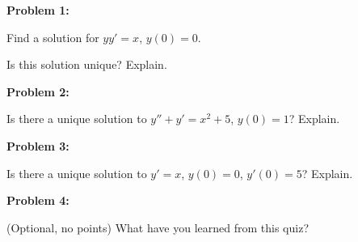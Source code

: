\documentclass[a4paper,12pt]{article}
\begin{document}
{\Large{\bf Problem 1:}} 

Find a solution for $yy' = x$, $y(0) = 0$.

Is this solution unique? Explain.

\shunt

{\Large{\bf Problem 2:}} 

Is there a unique solution to $y'' + y' = x^2 + 5$, $y(0) = 1$? Explain.

\shunt

{\Large{\bf Problem 3:}} 

Is there a unique solution to $y'=x$, $y(0) = 0$, $y'(0) = 5$? Explain.

\shunt

{\Large{\bf Problem 4:}} 

(Optional, no points) What have you learned from this quiz?

\shunt
\end{document}
